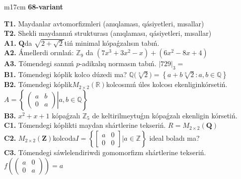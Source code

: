 \documentclass{article}
\begin{document}
\begin{tabular}{m{17cm}}
\textbf{68-variant}
\newline

\textbf{T1.} Maydanlar avtomorfizmleri (anıqlaması, qásiyetleri, mısallar) \\
\textbf{T2.} Shekli maydannıń strukturası (anıqlaması, qásiyetleri, mısallar) \\
\textbf{A1.} \(\mathbf{Q}\)da \(\sqrt{2 + \sqrt{2}}\)tiń minimal kópaǵzalısın tabıń. \\
\textbf{A2.} Ámellerdi orınlań: \(\mathbb{Z}_{9}\) da \(\left( 7x^{3} + 3x^{2} - x \right) + \left( 6x^{2} - 8x + 4 \right)\) \\
\textbf{A3.} Tómendegi sannıń \(p\)-adikalıq normasın tabıń. \(|729|_{3} =\) \\
\textbf{B1.} Tómendegi kóplik kolco dúzedi ma? \(\mathbb{Q(}\sqrt[3]{2}) = \left\{ a + b\sqrt[3]{2}:a,b \in \mathbb{Q} \right\}\) \\
\textbf{B2.} Tómendegi kóplik\(M_{2 \times 2}\left( \mathbb{R} \right)\)kolcosınıń úles kolcosı ekenliginkórsetiń. \(A = \left\{ \left. \ \begin{pmatrix}
a & b \\
0 & a
\end{pmatrix} \right|a,b\mathbb{\in Q} \right\}\) \\
\textbf{B3.} \(x^{2} + x + 1\) kópaǵzalı \(\mathbb{Z}_{5}\) de keltirilmeytuǵın kópaǵzalı ekenligin kórsetiń. \\
\textbf{C1.} Tómendegi kóplikti maydan shártlerine tekseriń. \(R = M_{2 \times 2}\left( \mathbf{Q} \right)\) \\
\textbf{C2.} \(M_{2 \times 2}\left( \mathbf{Z} \right)\)kolcoda\(I = \left\{ \begin{bmatrix}
a & 0 \\
0 & 0
\end{bmatrix}|a\mathbb{\in Z} \right\}\) ideal boladı ma? \\
\textbf{C3.} Tómendegi sáwlelendiriwdi gomomorfizm shártlerine tekseriń. \(f\left( \begin{pmatrix}
a & 0 \\
0 & a
\end{pmatrix} \right) = a\) \\

\end{tabular}
\vspace{1cm}
\end{document}
